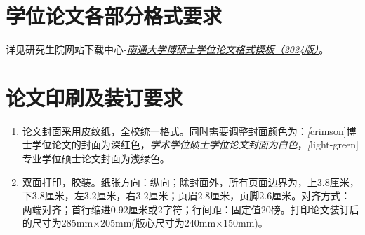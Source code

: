 \section{学位论文各部分格式要求}
详见研究生院网站下载中心-\href{https://yjs.ntu.edu.cn/2024/1009/c7679a250968/page.htm}{\emph{南通大学博硕士学位论文格式模板（2024版）}}。

\section{论文印刷及装订要求}
\begin{enumerate}
\item 论文封面采用皮纹纸，全校统一格式。同时需要调整封面颜色为：\emph[crimson]{博士学位论文的封面为深红色}，\emph{学术学位硕士学位论文封面为白色}，\emph[light-green]{专业学位硕士论文封面为浅绿色}。
\item 双面打印，胶装。纸张方向：纵向；除封面外，所有页面边界为，上3.8厘米，下3.8厘米，左3.2厘米，右3.2厘米；页眉2.8厘米，页脚2.6厘米。对齐方式：两端对齐；首行缩进0.92厘米或2字符；行间距：固定值20磅。打印论文装订后的尺寸为285mm×205mm(版心尺寸为240mm×150mm)。
\end{enumerate}

